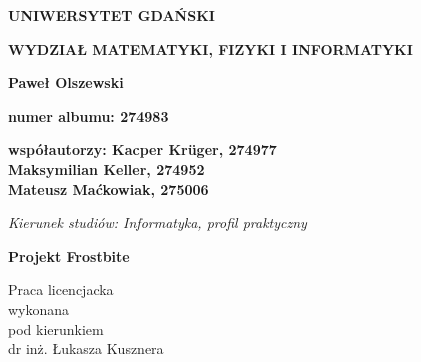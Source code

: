\documentclass{article}
\begin{document}
\begin{center}
    \begin{LARGE}
        \textbf{UNIWERSYTET GDAŃSKI}
    \end{LARGE}
\end{center}

\begin{center}
    \begin{LARGE}
        \textbf{WYDZIAŁ MATEMATYKI, FIZYKI I INFORMATYKI}
    \end{LARGE}
\end{center}

\vspace{0.5cm}

\begin{center}
    \begin{Large}
        \textbf{Paweł Olszewski}
    \end{Large}
\end{center}

\begin{center}
    \textbf{numer albumu: 274983}
\end{center}

\begin{center}
    \textbf{współautorzy: Kacper Krüger, 274977}\\
    \hspace{3.35cm}\textbf{Maksymilian Keller, 274952}\\
    \hspace{3.45cm}\textbf{Mateusz Maćkowiak, 275006}
\end{center}

\vspace{2cm}

\textit{Kierunek studiów: Informatyka, profil praktyczny}

\vspace{2cm}

\begin{center}
    \begin{LARGE}
        \textbf{Projekt Frostbite}
    \end{LARGE}
\end{center}

\vspace{3cm}

\begin{flushright}
    Praca licencjacka\\wykonana\\pod kierunkiem\\dr inż. Łukasza Kusznera
\end{flushright}
\end{document}

